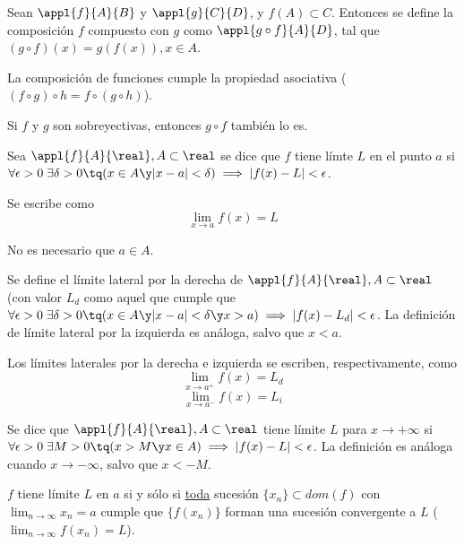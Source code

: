 \documentclass[nochap]{apuntes}
\begin{document}
\begin{defn} Sean $\appl{f}{A}{B}$ y $\appl{g}{C}{D}$, y $f(A)\subset C$. Entonces se define la composición $f$ compuesto con $g$ como $\appl{g\circ f}{A}{D}$, tal que $(g \circ f)(x)=g(f(x)), x \in A$.

La composición de funciones cumple la propiedad asociativa ($(f\circ g)\circ h=f\circ (g\circ h)$).

Si $f$ y $g$ son sobreyectivas, entonces $g\circ f$ también lo es.
\end{defn}

\begin{defn}[Límite] Sea $\appl{f}{A}{\real}, A\subset\real$ se dice que $f$ tiene límte $L$ en el punto $a$ si $\forall \epsilon > 0 \; \exists \delta >0 \tq (x\in A \y |x-a|<\delta) \implies |f(x)-L|<\epsilon$.

Se escribe como \[\lim_{x\to a}f(x)=L\]
\end{defn}

\begin{remark}
No es necesario que $a\in A$.\end{remark}

\begin{defn} Se define el límite lateral por la derecha de $\appl{f}{A}{\real}, A\subset\real$ (con valor $L_d$ como aquel que cumple que $\forall  \epsilon >0 \;\exists\delta >0 \tq( x\in A \y |x-a| <\delta \y x>a) \implies |f(x)-L_d|<\epsilon$. La definición de límite lateral por la izquierda es análoga, salvo que $x<a$.

Los límites laterales por la derecha e izquierda se escriben, respectivamente, como
\[ \lim_{x\to a^{+}}f(x)=L_d\]
\[ \lim_{x\to a^{-}}f(x)=L_i\]
\end{defn}

\begin{defn} Se dice que $\appl{f}{A}{\real}, A\subset\real$ tiene límite $L$ para $x\to +\infty$ si $\forall \epsilon > 0\; \exists M >0 \tq (x>M\y x\in A)\implies |f(x)-L|<\epsilon$. La definición es análoga cuando $x\to -\infty$, salvo que $x<-M$.

\end{defn}

\begin{theorem}
$f$ tiene límite $L$ en $a$ si y sólo si \underline{toda} sucesión $\{x_n\}\subset dom(f)$ con $\lim_{n\to\infty} x_n=a$ cumple que $\{f(x_n)\}$ forman una sucesión convergente a $L$ ($\lim_{n\to\infty}f(x_n)=L$).
\end{theorem}
\end{document}
